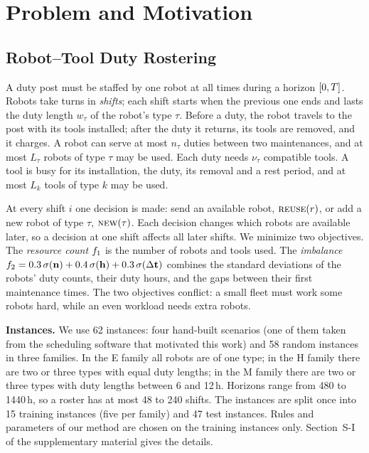 \section{Problem and Motivation}
\label{sec:problem}


\subsection{Robot--Tool Duty Rostering}
\label{sec:problem:model}

A duty post must be staffed by one robot at all times during a horizon $[0,T]$.
Robots take turns in \emph{shifts}; each shift starts when the previous one ends and lasts the duty length $w_\tau$ of the robot's type $\tau$.
Before a duty, the robot travels to the post with its tools installed; after the duty it returns, its tools are removed, and it charges.
A robot can serve at most $n_\tau$ duties between two maintenances, and at most $L_\tau$ robots of type $\tau$ may be used.
Each duty needs $\nu_\tau$ compatible tools.
A tool is busy for its installation, the duty, its removal and a rest period, and at most $L_k$ tools of type $k$ may be used.

At every shift $i$ one decision is made: send an available robot, $\textsc{reuse}(r)$, or add a new robot of type $\tau$, $\textsc{new}(\tau)$.
Each decision changes which robots are available later, so a decision at one shift affects all later shifts.
We minimize two objectives.
The \emph{resource count} $f_{1}$ is the number of robots and tools used.
The \emph{imbalance} $f_{2} = 0.3\,\sigma(\mathbf{n}) + 0.4\,\sigma(\mathbf{h}) + 0.3\,\sigma(\Delta\mathbf{t})$ combines the standard deviations of the robots' duty counts, their duty hours, and the gaps between their first maintenance times.
The two objectives conflict: a small fleet must work some robots hard, while an even workload needs extra robots.

\textbf{Instances.}
We use 62 instances: four hand-built scenarios (one of them taken from the scheduling software that motivated this work) and 58 random instances in three families.
In the E family all robots are of one type; in the H family there are two or three types with equal duty lengths; in the M family there are two or three types with duty lengths between 6 and 12\,h.
Horizons range from 480 to 1440\,h, so a roster has at most 48 to 240 shifts.
The instances are split once into 15 training instances (five per family) and 47 test instances.
Rules and parameters of our method are chosen on the training instances only.
Section~S-I of the supplementary material gives the details.

